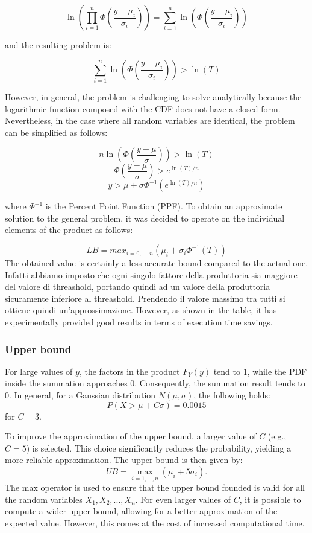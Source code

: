 $$\ln(\prod_{i = 1}^n \Phi(\frac{y - \mu_i}{\sigma_i})) = \sum_{i=1}^n  \ln(\Phi(\frac{y - \mu_i}{\sigma_i}))  $$

and the resulting problem is:

$$ \sum_{i=1}^n  \ln(\Phi(\frac{y - \mu_i}{\sigma_i})) > \ln(T) $$

However, in general, the problem is challenging to solve analytically because the logarithmic function composed with the CDF does not have a closed form. Nevertheless, in the case where all random variables are identical, the problem can be simplified as follows:

$$
n \ln(\Phi(\frac{y - \mu}{\sigma})) > \ln(T)
$$
$$
\Phi(\frac{y - \mu}{\sigma}) > e^{\ln(T) / n}
$$
$$
y > \mu + \sigma \Phi^{-1}(e^{\ln(T) / n})
$$

where $\Phi^{-1}$ is the Percent Point Function (PPF). To obtain an approximate solution to the general problem, it was decided to operate on the individual elements of the product as follows:

$$LB = max_{i=0,...,n}( \mu_i + \sigma_i \Phi^{-1}(T))$$
The obtained value is certainly a less accurate bound compared to the actual one. Infatti abbiamo imposto che ogni singolo fattore della produttoria sia maggiore del valore di threashold, portando quindi ad un valore della produttoria sicuramente inferiore al threashold. Prendendo il valore massimo tra tutti si ottiene quindi un'approssimazione.
However, as shown in the table, it has experimentally provided good results in terms of execution time savings.



\subsubsection{Upper bound}

For large values of \( y \), the factors in the product \( F_Y(y) \) tend to 1, while the PDF inside the summation approaches 0. Consequently, the summation result tends to 0. In general, for a Gaussian distribution \( N(\mu, \sigma) \), the following holds:  
\[
P(X > \mu + C \sigma) = 0.0015
\]
for \( C = 3 \). 

To improve the approximation of the upper bound, a larger value of \( C \) (e.g., \( C = 5 \)) is selected. This choice significantly reduces the probability, yielding a more reliable approximation. The upper bound is then given by:  
\[
UB = \max_{i=1, \ldots, n} (\mu_i + 5 \sigma_i).
\]
The max operator is used to ensure that the upper bound founded is valid for all the random variables $X_1, X_2, ..., X_n$. For even larger values of \( C \), it is possible to compute a wider upper bound, allowing for a better approximation of the expected value. However, this comes at the cost of increased computational time.



